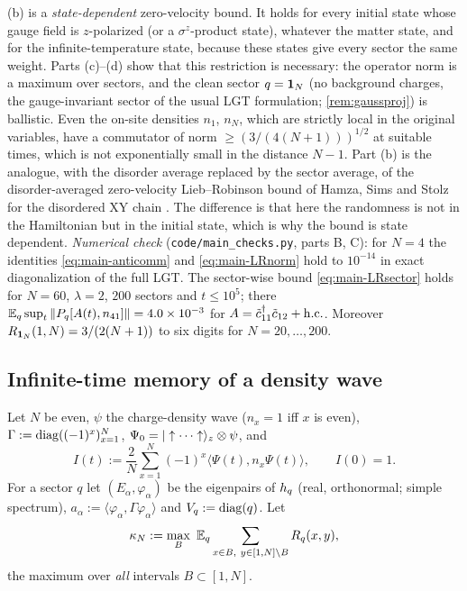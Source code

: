 \begin{remark}[Interpretation]\label{rem:main-LR}
(b) is a \emph{state-dependent} zero-velocity bound.  It holds for every initial state whose
gauge field is $z$-polarized (or a $\sigma^z$-product state), whatever the matter state, and for the
infinite-temperature state, because these states give every sector the same weight.  Parts (c)--(d) show that
this restriction is necessary: the operator norm is a maximum over sectors, and the clean sector $q=\mathbf{1}_N$ (no
background charges, the gauge-invariant sector of the usual LGT formulation; \cref{rem:gaussproj}) is ballistic.
Even the on-site densities $n_1$, $n_N$, which are strictly local in the original variables, have a commutator
of norm $\ge(3/(4(N+1)))^{1/2}$ at suitable times, which is not exponentially small in the distance $N-1$.
Part (b) is the analogue, with the disorder average replaced by the sector average, of the disorder-averaged
zero-velocity Lieb--Robinson bound of Hamza, Sims and Stolz for the disordered XY chain \cite{HSS2012}.  The
difference is that here the randomness is not in the Hamiltonian but in the initial state, which is why the
bound is state dependent.
\emph{Numerical check} (\texttt{code/main\_checks.py}, parts B, C): for $N=4$ the identities
\eqref{eq:main-anticomm} and \eqref{eq:main-LRnorm} hold to $10^{-14}$ in exact diagonalization of the full
LGT.  The sector-wise bound \eqref{eq:main-LRsector} holds for $N=60$, $\lambda=2$, $200$ sectors and
$t\le10^5$; there $\mathbb{E}_q\sup_t\left\|P_q[A(t),n_{41}]\right\|=4.0\times10^{-3}$ for
$A=\tilde c_{11}^\dagger\tilde c_{12}+{\rm h.c.}$.  Moreover $R_{\mathbf{1}_N}(1,N)=3/(2(N+1))$ to six digits for
$N=20,\dots,200$.
\end{remark}

\subsection{Infinite-time memory of a density wave}\label{sec:main:imbalance}

Let $N$ be even, $\psi$ the charge-density wave ($n_x=1$ iff $x$ is even), $\Gamma:=\operatorname{diag}((-1)^x)_{x=1}^N$,
$\Psi_0=|\uparrow\cdots\uparrow\rangle_z\otimes\psi$, and
\[
  I(t):=\frac2N\sum_{x=1}^N(-1)^x\langle\Psi(t),n_x\Psi(t)\rangle,\qquad I(0)=1 .
\]
For a sector $q$ let $(E_\alpha,\varphi_\alpha)$ be the eigenpairs of $h_{q}$ (real, orthonormal; simple spectrum),
$a_\alpha:=\langle\varphi_\alpha,\Gamma\varphi_\alpha\rangle$ and $V_q:=\operatorname{diag}(q)$.  Let
\begin{equation}\label{eq:main-kappa}
  \kappa_N:=\max_{B}\ \mathbb{E}_q\sum_{x\in B,\ y\in[1,N]\setminus B}R_q(x,y),
\end{equation}
the maximum over \emph{all} intervals $B\subset[1,N]$.

